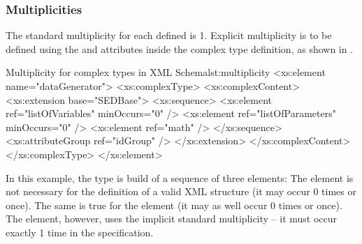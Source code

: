 \subsubsection{Multiplicities}
The standard multiplicity for each defined  is 1. Explicit multiplicity is to be defined using the  and  attributes inside the complex type definition, as shown in .

\begin{myXmlLst}{Multiplicity for complex types in XML Schema}{lst:multiplicity}
<xs:element name="dataGenerator">
	<xs:complexType>
		<xs:complexContent>
			<xs:extension base="SEDBase">
				<xs:sequence>
					<xs:element ref="listOfVariables" minOccurs="0" />
					<xs:element ref="listOfParameters" minOccurs="0" />
					<xs:element ref="math" />
				</xs:sequence>
				<xs:attributeGroup ref="idGroup" />
			</xs:extension>
		</xs:complexContent>
	</xs:complexType>
</xs:element>
\end{myXmlLst}
%
In this example, the  type is build of a sequence of three elements: The  element is not necessary for the definition of a valid  XML structure (it may occur 0 times or once). The same is true for the  element (it may as well occur 0 times or once). The  element, however, uses the implicit standard multiplicity -- it must occur exactly 1 time in the  specification.

